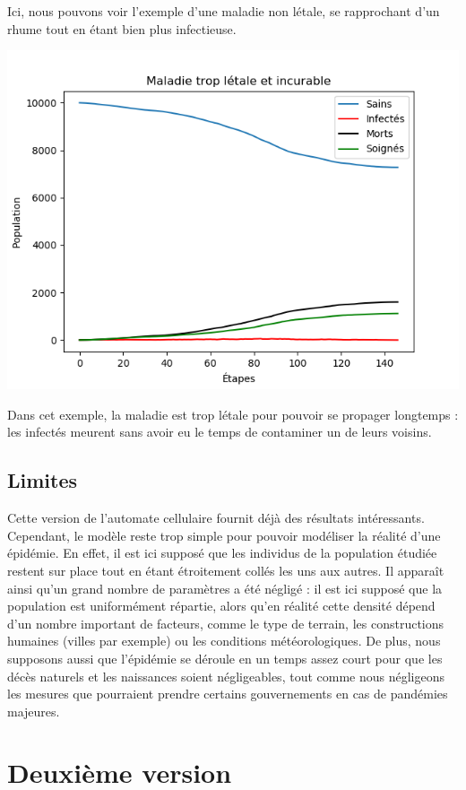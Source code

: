 \documentclass{article}
\begin{document}
	Ici, nous pouvons voir l'exemple d'une maladie non létale, se rapprochant d'un rhume tout en étant bien plus infectieuse.


\includegraphics[scale=1]{Figure_3.png}



Dans cet exemple, la maladie est trop létale pour pouvoir se propager longtemps : les infectés meurent sans avoir eu le temps de contaminer un de leurs voisins.
\subsection{Limites}
	Cette version de l'automate cellulaire fournit déjà des résultats intéressants. Cependant, le modèle reste trop simple pour pouvoir modéliser la réalité d'une épidémie. En effet, il est ici supposé que les individus de la population étudiée restent sur place tout en étant étroitement collés les uns aux autres.
Il apparaît ainsi qu'un grand nombre de paramètres a été négligé : il est ici supposé que la population est uniformément répartie, alors qu'en réalité cette densité dépend d'un nombre important de facteurs, comme le type de terrain, les constructions humaines (villes par exemple) ou les conditions météorologiques. De plus, nous supposons aussi que l'épidémie se déroule en un temps assez court pour que les décès naturels et les naissances soient négligeables, tout comme nous négligeons les mesures que pourraient prendre certains gouvernements en cas de pandémies majeures.
	
	
	
\section{Deuxième version}
\end{document}
